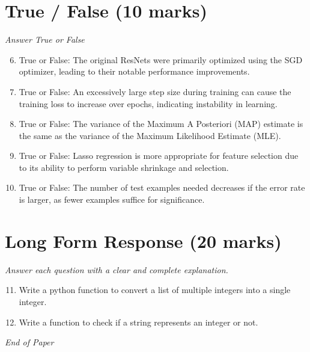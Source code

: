 \documentclass[12pt]{article}
\begin{document}
\section*{True / False (10 marks)}
\textit{Answer True or False}
\begin{enumerate}[label=\arabic*.]
\setcounter{enumi}{5}
\item True or False: The original ResNets were primarily optimized using the SGD optimizer, leading to their notable performance improvements.
\item True or False: An excessively large step size during training can cause the training loss to increase over epochs, indicating instability in learning.
\item True or False: The variance of the Maximum A Posteriori (MAP) estimate is the same as the variance of the Maximum Likelihood Estimate (MLE).
\item True or False: Lasso regression is more appropriate for feature selection due to its ability to perform variable shrinkage and selection.
\item True or False: The number of test examples needed decreases if the error rate is larger, as fewer examples suffice for significance.
\end{enumerate}

\section*{Long Form Response (20 marks)}
\textit{Answer each question with a clear and complete explanation.}
\begin{enumerate}[label=\arabic*.]
\setcounter{enumi}{10}
\item Write a python function to convert a list of multiple integers into a single integer.
\item Write a function to check if a string represents an integer or not.
\end{enumerate}

\vfill
\noindent\textit{End of Paper}
\end{document}
